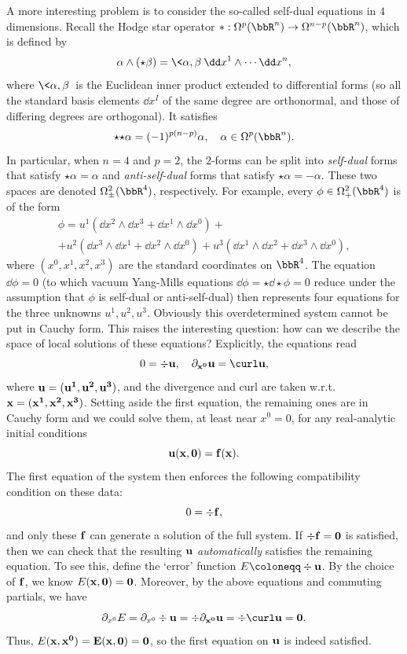 \begin{example}\label{ex self-dual equations}
    A more interesting problem is to consider the so-called self-dual equations in $4$ dimensions. Recall the Hodge star operator $\ast:\Omega^p(\bbR^n)\to \Omega^{n-p}(\bbR^n)$, which is defined by 
    \[\alpha\wedge(\star \beta)=\<\alpha,\beta\>\dd x^1\wedge\cdots\dd x^n,\]
    where $\<\alpha,\beta\>$ is the Euclidean inner product extended to differential forms (so all the standard basis elements $\dd x^I$ of the same degree are orthonormal, and those of differing degrees are orthogonal). It satisfies 
    \[{\star}{\star}\alpha=(-1)^{p(n-p)}\alpha,\quad \alpha\in\Omega^p(\bbR^n).\]
    In particular, when $n=4$ and $p=2$, the $2$-forms can be split into \emph{self-dual} forms that satisfy $\star\alpha=\alpha$ and \emph{anti-self-dual} forms that satisfy $\star\alpha=-\alpha$. These two spaces are denoted $\Omega^2_\pm(\bbR^4)$, respectively. For example, every $\phi\in\Omega^2_+(\bbR^4)$ is of the form 
    \begin{multline}
        \phi=u^1(\dd x^2\wedge\dd x^3+\dd x^1\wedge\dd x^0)+\\
        +u^2(\dd x^3\wedge\dd x^1+\dd x^2\wedge\dd x^0)+u^3(\dd x^1\wedge\dd x^2+\dd x^3\wedge\dd x^0),
    \end{multline}
    where $(x^0,x^1,x^2,x^3)$ are the standard coordinates on $\bbR^4$. 
    The equation $\dd\phi=0$ (to which vacuum Yang-Mills equations $\dd \phi={\star}{\dd}{\star}\phi=0$ reduce under the assumption that $\phi$ is self-dual or anti-self-dual) then represents four equations for the three unknowns $u^1,u^2,u^3$. Obviously this overdetermined system cannot be put in Cauchy form. This raises the interesting question: how can we describe the space of local solutions of these equations? Explicitly, the equations read 
    \[
        0=\div \bf{u}, \quad \partial_{x^0}\bf{u}=\curl\bf{u},
    \]
    where $\bf{u}=(u^1,u^2,u^3)$, and the divergence and curl are taken w.r.t.~$\bf{x}=(x^1,x^2,x^3)$. Setting aside the first equation, the remaining ones are in Cauchy form and we could solve them, at least near $x^0=0$, for any real-analytic initial conditions 
    \[\bf{u}(\bf{x},0)=\bf{f}(\bf{x}).\]
    The first equation of the system then enforces the following compatibility condition on these data:
    \[0=\div \bf{f},\]
    and only these $\bf{f}$ can generate a solution of the full system. If $\div\bf{f}=0$ is satisfied, then we can check that the resulting $\bf{u}$ \emph{automatically} satisfies the remaining equation. To see this, define the `error' function $E\coloneqq \div\bf{u}$. By the choice of $\bf{f}$, we know $E(\bf{x},0)=0$. Moreover, by the above equations and commuting partials, we have 
    \[\partial_{x^0}E=\partial_{x^0}\div\bf{u}=\div\partial_{x^0}\bf{u}=\div\curl\bf{u}=0.\]
    Thus, $E(\bf{x},x^0)=E(\bf{x},0)=0$, so the first equation on $\bf{u}$ is indeed satisfied.


\end{example}
